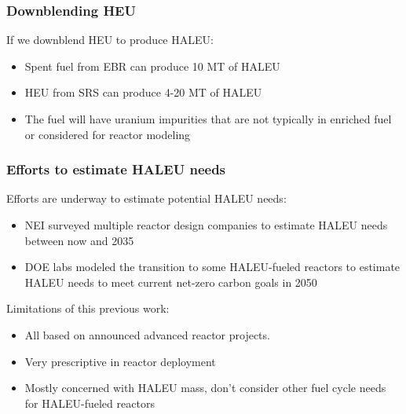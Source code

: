 \begin{frame}
    \frametitle{Downblending HEU}
    If we downblend \gls{HEU} to produce \gls{HALEU}:
    \begin{itemize}
        \item Spent fuel from \gls{EBR} can produce 10 MT of \gls{HALEU}
              \cite{nuclear_energy_institute_establishing_2022}
        \item \gls{HEU} from \gls{SRS} can produce 4-20 MT of \gls{HALEU}
              \cite{nuclear_energy_institute_establishing_2022,regalbuto_addressing_2020}
        \item<2-> The fuel will have uranium impurities that are not typically 
              in enriched fuel or considered for reactor modeling 
              \cite{nelson_foreign_2010,vaden_isotopic_2018}
    \end{itemize}
\end{frame}

\begin{frame}
    \frametitle{Efforts to estimate HALEU needs}
    Efforts are underway to estimate potential \gls{HALEU} needs:
    \begin{itemize}
        \item \gls{NEI} surveyed multiple reactor design companies
              to estimate \gls{HALEU} needs between now and 2035 
              \cite{korsnick_updated_2021,nuclear_energy_institute_establishing_2022}
        \item \gls{DOE} labs modeled the transition to some 
              \gls{HALEU}-fueled reactors to estimate \gls{HALEU} needs 
              to meet current net-zero carbon goals in 2050 \cite{dixon_estimated_2022}
    \end{itemize}
    \pause
    Limitations of this previous work:
    \begin{itemize}
        \item All based on announced advanced reactor projects.
        \item Very prescriptive in reactor deployment
        \item<3-> Mostly concerned with \gls{HALEU} mass, don't consider 
              other fuel cycle needs for \gls{HALEU}-fueled reactors
    \end{itemize}
\end{frame}

